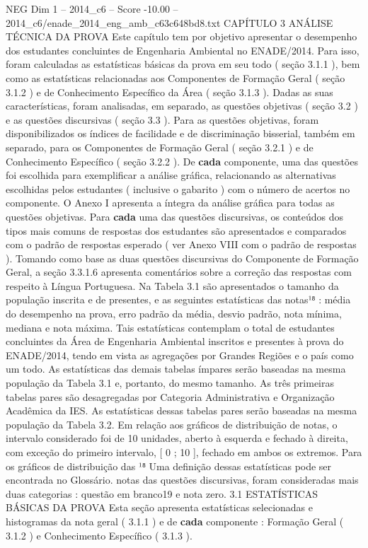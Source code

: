 \begin{textsample}{NEG Dim 1 – 2014\_c6 – Score -10.00 – 2014\_c6/enade\_2014\_eng\_amb\_c63c648bd8.txt}  \label{ex:f1_neg_006}
CAPÍTULO 3 ANÁLISE TÉCNICA DA PROVA Este capítulo tem por objetivo apresentar o desempenho dos estudantes concluintes de Engenharia Ambiental no ENADE/2014.
Para isso, foram calculadas as estatísticas básicas da prova em seu todo ( seção 3.1.1 ), bem como as estatísticas relacionadas aos Componentes de Formação Geral ( seção 3.1.2 ) e de Conhecimento Específico da Área ( seção 3.1.3 ).
Dadas as suas características, foram analisadas, em separado, as questões objetivas ( seção 3.2 ) e as questões discursivas ( seção 3.3 ).
Para as questões objetivas, foram disponibilizados os índices de facilidade e de discriminação bisserial, também em separado, para os Componentes de Formação Geral ( seção 3.2.1 ) e de Conhecimento Específico ( seção 3.2.2 ).
De \textbf{cada} componente, uma das questões foi escolhida para exemplificar a análise gráfica, relacionando as alternativas escolhidas pelos estudantes ( inclusive o gabarito ) com o número de acertos no componente.
O Anexo I apresenta a íntegra da análise gráfica para todas as questões objetivas.
Para \textbf{cada} uma das questões discursivas, os conteúdos dos tipos mais comuns de respostas dos estudantes são apresentados e comparados com o padrão de respostas esperado ( ver Anexo VIII com o padrão de respostas ).
Tomando como base as duas questões discursivas do Componente de Formação Geral, a seção 3.3.1.6 apresenta comentários sobre a correção das respostas com respeito à Língua Portuguesa.
Na Tabela 3.1 são apresentados o tamanho da população inscrita e de presentes, e as seguintes estatísticas das notas¹⁸ : média do desempenho na prova, erro padrão da média, desvio padrão, nota mínima, mediana e nota máxima.
Tais estatísticas contemplam o total de estudantes concluintes da Área de Engenharia Ambiental inscritos e presentes à prova do ENADE/2014, tendo em vista as agregações por Grandes Regiões e o país como um todo.
As estatísticas das demais tabelas ímpares serão baseadas na mesma população da Tabela 3.1 e, portanto, do mesmo tamanho.
As três primeiras tabelas pares são desagregadas por Categoria Administrativa e Organização Acadêmica da IES.
As estatísticas dessas tabelas pares serão baseadas na mesma população da Tabela 3.2.
Em relação aos gráficos de distribuição de notas, o intervalo considerado foi de 10 unidades, aberto à esquerda e fechado à direita, com exceção do primeiro intervalo, [ 0 ; 10 ], fechado em ambos os extremos.
Para os gráficos de distribuição das ¹⁸ Uma definição dessas estatísticas pode ser encontrada no Glossário. notas das questões discursivas, foram consideradas mais duas categorias : questão em branco19 e nota zero. 3.1 ESTATÍSTICAS BÁSICAS DA PROVA Esta seção apresenta estatísticas selecionadas e histogramas da nota geral ( 3.1.1 ) e de \textbf{cada} componente : Formação Geral ( 3.1.2 ) e Conhecimento Específico ( 3.1.3 ).

\end{textsample}
